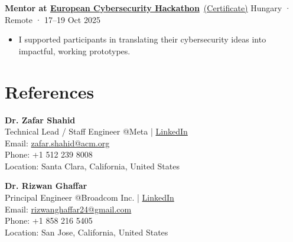 \documentclass[a4paper,12pt]{article}
\begin{document}
\textbf{Mentor at \href{https://cyberhubs.eu/european-cybersecurity-hackathon-2025-ready-to-take-the-challenge/}{European Cybersecurity Hackathon}}~\href{https://drive.google.com/file/d/1HdK8eSl7OtU3rPIkfh5ytRqUkZE4SsNM/view}{(Certificate)} \hfill Hungary · Remote · 17–19 Oct 2025
\begin{itemize}[leftmargin=*]
    \item I supported participants in translating their cybersecurity ideas into impactful, working prototypes.
\end{itemize}




\section{References}

\textbf{Dr. Zafar Shahid} \\
Technical Lead / Staff Engineer @Meta | \href{https://www.linkedin.com/in/zafarshahid/}{LinkedIn} \\
Email: \href{mailto:zafar.shahid@acm.org}{zafar.shahid@acm.org} \\
Phone: +1 512 239 8008 \\
Location: Santa Clara, California, United States

\vspace{1em}

\textbf{Dr. Rizwan Ghaffar} \\
Principal Engineer @Broadcom Inc. | \href{https://www.linkedin.com/in/rizwan-ghaffar/}{LinkedIn} \\
Email: \href{mailto:rizwanghaffar24@gmail.com}{rizwanghaffar24@gmail.com} \\
Phone: +1 858 216 5405 \\
Location: San Jose, California, United States


\vfill
\end{document}
